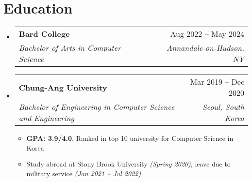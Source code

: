 \documentclass[letterpaper,11pt]{article}
\makeatletter
\newcommand{\resumeItem}[1]{
  \item\small{
    {#1 \vspace{-2pt}}
  }
}
\newcommand{\resumeSubheading}[4]{
  \item
    \begin{tabular*}{0.98\textwidth}[t]{l@{\extracolsep{\fill}}r}
      \hspace{-1.5pt}\textbf{#1} & #2 \\
      \hspace{-1.5pt}\textit{\small#3} & \textit{\small #4} \\
    \end{tabular*}\vspace{-6pt}
}
\newcommand{\resumeSubHeadingListStart}{\begin{itemize}[leftmargin=0.1in, label={}]}
\newcommand{\resumeSubHeadingListEnd}{\end{itemize}}
\newcommand{\resumeItemListStart}{\begin{itemize}[leftmargin=0.22in]}
\newcommand{\resumeItemListEnd}{\end{itemize}\vspace{-5.7pt}}
\makeatother
\begin{document}
\section{Education}
  \resumeSubHeadingListStart
    \resumeSubheading
      {Bard College}{Aug 2022 -- May 2024}
      {Bachelor of Arts in Computer Science}{Annandale-on-Hudson, NY}
    \resumeSubheading
      {Chung-Ang University}{Mar 2019 -- Dec 2020}
      {Bachelor of Engineering in Computer Science and Engineering}{Seoul, South Korea}
      \resumeItemListStart
        \resumeItem{\textbf{GPA: 3.9/4.0}, Ranked in top 10 university for Computer Science in Korea}
        \resumeItem{Study abroad at Stony Brook University \textit{(Spring 2020)}, leave due to military service \textit{(Jan 2021 -- Jul 2022)}}
      \resumeItemListEnd
  \resumeSubHeadingListEnd

\end{document}
